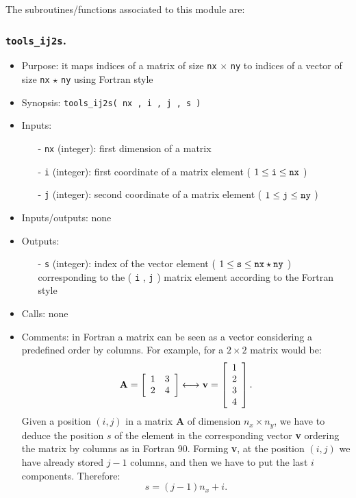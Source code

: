 \documentclass[12pt]{article}
\begin{document}
The subroutines/functions associated to this module are:

\subsubsection{{\tt tools\_ij2s}.}
\begin{itemize}
\item Purpose: it maps indices of a matrix of size {\tt nx} $\times$ {\tt ny} to indices of a vector of size {\tt nx} $\star$ {\tt ny} using Fortran style
\item Synopsis: {\tt tools\_ij2s( nx , i , j , s )}
\item Inputs:
\begin{itemize}
\item[-] {\tt nx} (integer): first dimension of a matrix
\item[-] {\tt i} (integer): first coordinate of a matrix element ( $1 \leq {\tt i} \leq {\tt nx}$ )
\item[-] {\tt j} (integer): second coordinate of a matrix element ( $1 \leq {\tt j} \leq {\tt ny}$ )
\end{itemize}
\item Inputs/outputs: none
\item Outputs: 
\begin{itemize}
\item[-] {\tt s} (integer): index of the vector element ( $1 \leq {\tt s} \leq {\tt nx} \star {\tt ny}$ ) corresponding to the ( {\tt i} , {\tt j} ) matrix element according to the Fortran style
\end{itemize}
\item Calls: none
\item Comments: in Fortran a matrix can be seen as a vector considering a predefined order by columns. For example, for a $2 \times 2$ matrix would be:
\begin{equation}
{\bf A} = \left[ \begin{array}{cc} 1 & 3 \\ 2 & 4 \end{array} \right] \longleftrightarrow {\bf v} = \left[ \begin{array}{c} 1 \\ 2 \\ 3 \\ 4 \end{array} \right].
\end{equation}
Given a position $\left( i , j \right)$ in a matrix {\bf A} of dimension $n_x \times n_y$, we have to deduce the position $s$ of the element in the corresponding vector {\bf v} ordering the matrix by columns as in Fortran 90. Forming {\bf v}, at the position $\left( i , j \right)$ we have already stored $j - 1$ columns, and then we have to put the last $i$ components. Therefore:
\begin{equation}
s = \left( j - 1 \right) n_x + i.
\end{equation}  
\end{itemize}
\end{document}
